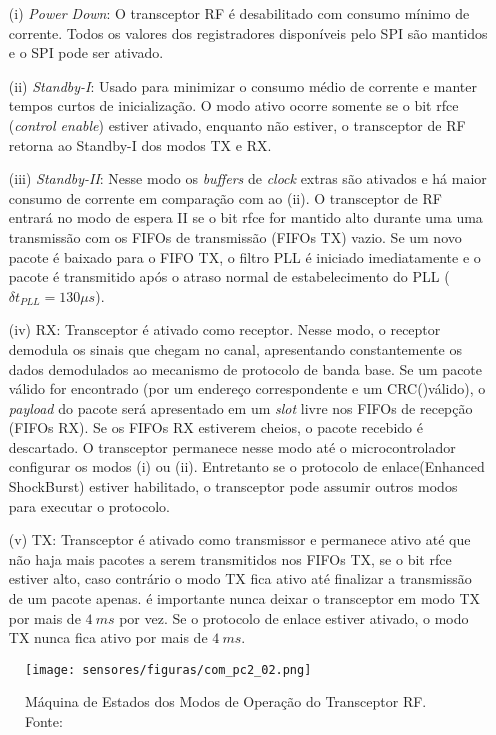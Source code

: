 \begin{itemize}

	\item[(i)] \emph{Power Down}: O transceptor RF é desabilitado com consumo mínimo de corrente. Todos os valores dos registradores disponíveis pelo SPI são mantidos e o SPI pode ser ativado.
	\item[(ii)] \emph{Standby-I}: Usado para minimizar o consumo médio de corrente e manter tempos curtos de inicialização. O modo ativo ocorre somente se o bit rfce (\emph{control enable}) estiver ativado, enquanto não estiver, o transceptor de RF retorna ao Standby-I dos modos TX e RX.
	\item[(iii)] \emph{Standby-II}: Nesse modo os \emph{buffers} de \emph{clock} extras são ativados e há maior consumo de corrente em comparação com ao (ii). O transceptor de RF entrará no modo de espera II se o bit rfce for mantido alto durante uma uma transmissão com os FIFOs de transmissão (FIFOs TX) vazio. Se um novo pacote é baixado para o FIFO TX, o filtro PLL é iniciado imediatamente e o pacote é transmitido após o atraso normal de estabelecimento do PLL ($\delta t _ {PLL} = 130 \mu s$).
	\item[(iv)] RX: Transceptor é ativado como receptor. Nesse modo, o receptor demodula os sinais que chegam no canal, apresentando constantemente os dados demodulados ao mecanismo de protocolo de banda base. Se um pacote válido for encontrado (por um endereço correspondente e um CRC()válido), o \emph{payload} do pacote será apresentado em um \emph{slot} livre nos FIFOs de recepção (FIFOs RX). Se os FIFOs RX estiverem cheios, o pacote recebido é descartado.
	O transceptor permanece nesse modo até o microcontrolador configurar os modos (i) ou (ii). Entretanto se o protocolo de enlace(Enhanced ShockBurst\texttrademark) estiver habilitado, o transceptor pode assumir outros modos para executar o protocolo.
	\item[(v)] TX: Transceptor é ativado como transmissor e permanece ativo até que não haja mais pacotes a serem transmitidos nos FIFOs TX, se o bit rfce estiver alto, caso contrário o modo TX fica ativo até finalizar a transmissão de um pacote apenas. é importante nunca deixar o transceptor em modo TX por mais de $4~ms$ por vez. Se o protocolo de enlace estiver ativado, o modo TX nunca fica ativo por mais de $4~ms$.
\end{itemize}


\begin{figure}[H]
\centering
	\label{com_pc2_02}
	\texttt{[image: sensores/figuras/com\_pc2\_02.png]}
   \caption{Máquina de Estados dos Modos de Operação do Transceptor RF. Fonte: \cite{bib_com_01_yas}}
\end{figure}

